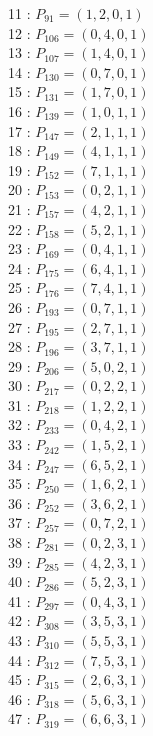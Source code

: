 \documentclass{article}
\begin{document}
{\begin{multicols}{3}
11 : $P_{91}=( 1, 2, 0, 1 )$\\
12 : $P_{106}=( 0, 4, 0, 1 )$\\
13 : $P_{107}=( 1, 4, 0, 1 )$\\
14 : $P_{130}=( 0, 7, 0, 1 )$\\
15 : $P_{131}=( 1, 7, 0, 1 )$\\
16 : $P_{139}=( 1, 0, 1, 1 )$\\
17 : $P_{147}=( 2, 1, 1, 1 )$\\
18 : $P_{149}=( 4, 1, 1, 1 )$\\
19 : $P_{152}=( 7, 1, 1, 1 )$\\
20 : $P_{153}=( 0, 2, 1, 1 )$\\
21 : $P_{157}=( 4, 2, 1, 1 )$\\
22 : $P_{158}=( 5, 2, 1, 1 )$\\
23 : $P_{169}=( 0, 4, 1, 1 )$\\
24 : $P_{175}=( 6, 4, 1, 1 )$\\
25 : $P_{176}=( 7, 4, 1, 1 )$\\
26 : $P_{193}=( 0, 7, 1, 1 )$\\
27 : $P_{195}=( 2, 7, 1, 1 )$\\
28 : $P_{196}=( 3, 7, 1, 1 )$\\
29 : $P_{206}=( 5, 0, 2, 1 )$\\
30 : $P_{217}=( 0, 2, 2, 1 )$\\
31 : $P_{218}=( 1, 2, 2, 1 )$\\
32 : $P_{233}=( 0, 4, 2, 1 )$\\
33 : $P_{242}=( 1, 5, 2, 1 )$\\
34 : $P_{247}=( 6, 5, 2, 1 )$\\
35 : $P_{250}=( 1, 6, 2, 1 )$\\
36 : $P_{252}=( 3, 6, 2, 1 )$\\
37 : $P_{257}=( 0, 7, 2, 1 )$\\
38 : $P_{281}=( 0, 2, 3, 1 )$\\
39 : $P_{285}=( 4, 2, 3, 1 )$\\
40 : $P_{286}=( 5, 2, 3, 1 )$\\
41 : $P_{297}=( 0, 4, 3, 1 )$\\
42 : $P_{308}=( 3, 5, 3, 1 )$\\
43 : $P_{310}=( 5, 5, 3, 1 )$\\
44 : $P_{312}=( 7, 5, 3, 1 )$\\
45 : $P_{315}=( 2, 6, 3, 1 )$\\
46 : $P_{318}=( 5, 6, 3, 1 )$\\
47 : $P_{319}=( 6, 6, 3, 1 )$\\

\end{multicols}}
\end{document}
